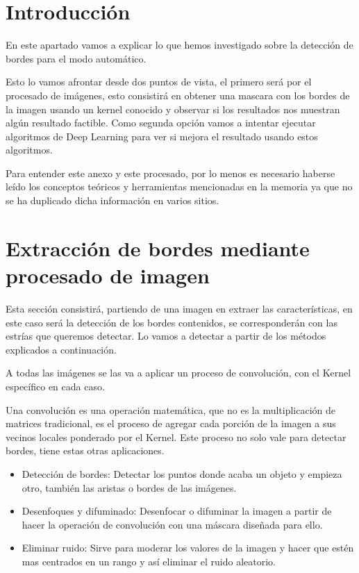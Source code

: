 \label{anexo:F}
\section{Introducción}
En este apartado vamos a explicar lo que hemos investigado sobre la detección de bordes para el modo automático.

Esto lo vamos afrontar desde dos puntos de vista, el primero será por el procesado de imágenes, esto consistirá en obtener una mascara con los bordes de la imagen usando un kernel conocido y observar si los resultados nos muestran algún resultado factible.
Como segunda opción vamos a intentar ejecutar algoritmos de Deep Learning para ver si mejora el resultado usando estos algoritmos.

Para entender este anexo y este procesado, por lo menos es necesario haberse leído los conceptos teóricos y herramientas mencionadas en la memoria ya que no se ha duplicado dicha información en varios sitios.

\section{Extracción de bordes mediante procesado de imagen}
Esta sección consistirá, partiendo de una imagen en extraer las características, en este caso será la detección de los bordes contenidos, se corresponderán con las estrías que queremos detectar. Lo vamos a detectar a partir de los métodos explicados a continuación. 

A todas las imágenes se las va a aplicar un proceso de convolución, con el Kernel \cite{wiki:kernels} específico en cada caso.

Una convolución es una operación matemática, que no es la multiplicación de matrices tradicional, es el proceso de agregar cada porción de la imagen a sus vecinos locales ponderado por el Kernel. 
Este proceso no solo vale para detectar bordes, tiene estas otras aplicaciones.
\begin{itemize}
\item Detección de bordes: Detectar los puntos donde acaba un objeto y empieza otro, también las aristas o bordes de las imágenes.
\item Desenfoques y difuminado: Desenfocar o difuminar la imagen a partir de hacer la operación de convolución con una máscara diseñada para ello.
\item Eliminar ruido: Sirve para moderar los valores de la imagen  y hacer que estén mas centrados en un rango y así eliminar el ruido aleatorio. 
\end{itemize}

